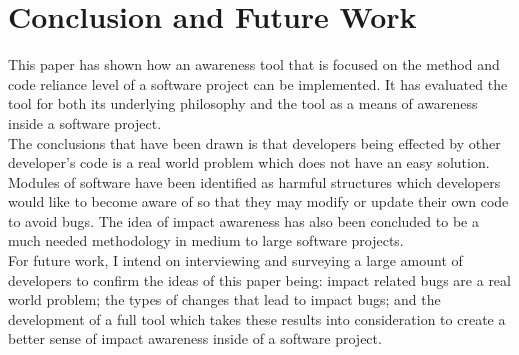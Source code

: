 \documentclass[conference]{IEEEtran}
\begin{document}
\section{Conclusion and Future Work}

This paper has shown how an awareness tool that is focused on the method and code reliance
level of a software project can be implemented. It has evaluated the tool for both its underlying
philosophy and the tool as a means of awareness inside a software project. \\

The conclusions that have been drawn is that developers being effected by other developer's
code is a real world problem which does not have an easy solution. Modules of software
have been identified as harmful structures which developers would like to become
aware of so that they may modify or update their own code to avoid bugs. The idea of
impact awareness has also been concluded to be a much needed methodology in 
medium to large software projects.\\

For future work, I intend on interviewing and surveying a large amount of developers
to confirm the ideas of this paper being: impact related bugs are a real world problem; the
types of changes that lead to impact bugs; and the development of a full tool which takes
these results into consideration to create a better sense of impact awareness inside of
a software project.





\end{document}
